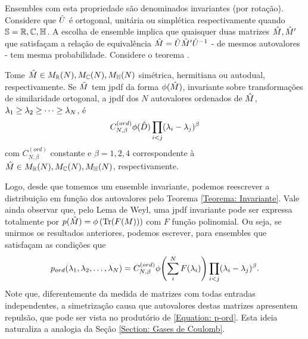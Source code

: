 Ensembles com esta propriedade são denominados invariantes (por rotação). Considere que $\hat U$ é ortogonal, unitária ou simplética respectivamente quando $\mathbb{S} = \mathbb{R},\mathbb{C},\mathbb{H} $. A escolha de ensemble implica que quaisquer duas matrizes $\hat M, \hat M'$ que satisfaçam a relação de equivalência $\hat M = \hat U \hat M' \hat U^{-1}$ - de mesmos autovalores - tem mesma probabilidade. Considere o teorema \cite[Capítulo~3]{AlanThesis}.
\begin{thm}
	Tome $\hat M \in M_{\mathbb{R}}(N),  M_{\mathbb{C}}(N),  M_{\mathbb{H}}(N)$ simétrica, hermitiana ou autodual, respectivamente. Se  $\hat M$ tem jpdf da forma $\phi(\hat M)$, invariante sobre transformações de similaridade ortogonal, a jpdf dos $N$ autovalores ordenados de $\hat M$, $\lambda_1 \geq \lambda_2 \geq \dots \geq \lambda_N$, é $$ C_{N, \beta}^{(ord)} \phi(\hat D) \prod_{i < j} (\lambda_i - \lambda_j)^{\beta}$$ com $C_{N, \beta}^{(ord)}$ constante e $\beta = 1, 2, 4$ correspondente à $\hat M \in M_{\mathbb{R}}(N),  M_{\mathbb{C}}(N),  M_{\mathbb{H}}(N)$, respectivamente. 
	\label{Teorema: Invariante}
\end{thm}
Logo, desde que tomemos um ensemble invariante, podemos reescrever a distribuição em função dos autovalores pelo Teorema \ref{Teorema: Invariante}. Vale ainda observar que, pelo Lema de Weyl, uma jpdf invariante pode ser expressa totalmente por $p(\hat M)= \phi \left(\Tr(F(M)) \right)$ com $F$ função polinomial. Ou seja, se unirmos os resultados anteriores, podemos escrever, para ensembles que satisfaçam as condições que
\begin{equation}
	p_{ord}(\lambda_1, \lambda_2, \dots, \lambda_N) = C_{N, \beta}^{(ord)} \phi{\left( \sum_i^N F(\lambda_i) \right)} \prod_{i < j} (\lambda_i - \lambda_j)^{\beta}.
	\label{Equation: p-ord}
\end{equation}
Note que, diferentemente da medida de matrizes com todas entradas independentes, a simetrização causa que autovalores destas matrizes apresentem repulsão, que pode ser vista no produtório de \ref{Equation: p-ord}. Esta ideia naturaliza a analogia da Seção \ref{Section: Gases de Coulomb}.

